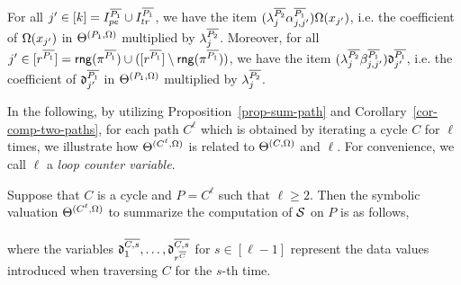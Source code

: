 For all $j'\in [k] = I^{\overline{P_1}}_{pe} \cup I^{\overline{P_1}}_{tr}$, we have the item $(\lambda^{\overline{P_2}}_{j} \alpha^{\overline{P_1}}_{j,j'}) \Omega(x_{j'})$, i.e. the coefficient of $\Omega(x_{j'})$ in $\Theta^{(P_1, \Omega)}$ multiplied by $\lambda^{\overline{P_2}}_{j}$. Moreover, for all $j'\in [r^{\overline{P_1}}] = \mathsf{rng}(\pi^{\overline{P_1}}) \cup ([r^{\overline{P_1}}] \setminus \mathsf{rng}(\pi^{\overline{P_1}}))$, we have 
the item $( \lambda^{\overline{P_2}}_{j} \beta^{\overline{P_1}}_{j,j'}) \mathfrak{d}^{\overline{P_1}}_{j'}$, i.e. the coefficient of $\mathfrak{d}^{\overline{P_1}}_{j'}$ in $\Theta^{(P_1, \Omega)}$ multiplied by $\lambda^{\overline{P_2}}_{j}$.

In the following, by utilizing Proposition~\ref{prop-sum-path} and Corollary~\ref{cor-comp-two-paths}, for each path $C^{\ell}$ which is obtained by iterating a cycle $C$ for $\ell$ times, we illustrate how $\Theta^{(C^\ell,\Omega)}$ is related to $\Theta^{(C, \Omega)}$ and $\ell$. For convenience, we call $\ell$ a \emph{loop counter variable}.

\begin{proposition}\label{prop-sum-cycle}
Suppose that $C$ is a cycle and $P=C^{\ell}$ such that $\ell \ge 2$. Then the symbolic valuation $\Theta^{(C^\ell,\Omega)}$ to summarize the computation of ${\mathcal{S} }$ on $P$ is as follows,\medskip\\
\medskip\\
where the variables $\mathfrak{d}^{\overline{C , s}}_{1},\dots, \mathfrak{d}^{\overline{C ,s}}_{r^{\overline{C}}}$ for $s\in [\ell-1]$
 represent the data values introduced when traversing $C$ for the $s$-th time.
\end{proposition}

